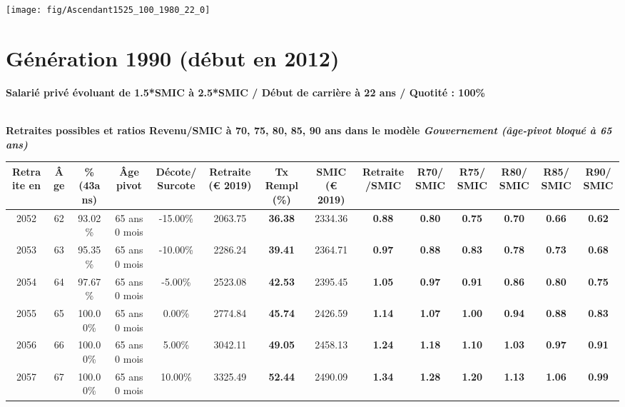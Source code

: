  {\hspace{-2.2cm}\texttt{[image: fig/Ascendant1525\_100\_1980\_22\_0]}} 

\newpage 
 
\section{Génération 1990 (début en 2012)\label{Ascendant1525_100_1990_22_0}} 
 
{\bf \noindent Salarié privé évoluant de 1.5*SMIC à 2.5*SMIC / Début de carrière à 22 ans / Quotité : 100\%}  ~ 

 ~\\{\bf \noindent Retraites possibles et ratios Revenu/SMIC à 70, 75, 80, 85, 90 ans dans le modèle \emph{Gouvernement (âge-pivot bloqué à 65 ans)}}  
 
\begin{adjustbox}{max width=\textwidth} 
\begin{tabular}[htb]{|c|c||c|c|c||c|c||c|c||c|c|c|c|c|} 
\hline 
 Retraite en &  Âge &  \%(43ans) &  Âge pivot &  Décote/Surcote &  Retraite (\euro{} 2019) &  Tx Rempl(\%) &  SMIC (\euro{} 2019) &  Retraite/SMIC &  R70/SMIC &  R75/SMIC &  R80/SMIC &  R85/SMIC &  R90/SMIC \\ 
\hline \hline 
 2052 &  62 &  93.02\% &  65 ans 0 mois &  -15.00\% &  2063.75 &  {\bf 36.38} &  2334.36 &  {\bf {\color{red} 0.88}} &  {\bf {\color{red} 0.80}} &  {\bf {\color{red} 0.75}} &  {\bf {\color{red} 0.70}} &  {\bf {\color{red} 0.66}} &  {\bf {\color{red} 0.62}} \\ 
\hline 
 2053 &  63 &  95.35\% &  65 ans 0 mois &  -10.00\% &  2286.24 &  {\bf 39.41} &  2364.71 &  {\bf {\color{red} 0.97}} &  {\bf {\color{red} 0.88}} &  {\bf {\color{red} 0.83}} &  {\bf {\color{red} 0.78}} &  {\bf {\color{red} 0.73}} &  {\bf {\color{red} 0.68}} \\ 
\hline 
 2054 &  64 &  97.67\% &  65 ans 0 mois &  -5.00\% &  2523.08 &  {\bf 42.53} &  2395.45 &  {\bf 1.05} &  {\bf {\color{red} 0.97}} &  {\bf {\color{red} 0.91}} &  {\bf {\color{red} 0.86}} &  {\bf {\color{red} 0.80}} &  {\bf {\color{red} 0.75}} \\ 
\hline 
 2055 &  65 &  100.00\% &  65 ans 0 mois &  0.00\% &  2774.84 &  {\bf 45.74} &  2426.59 &  {\bf 1.14} &  {\bf 1.07} &  {\bf 1.00} &  {\bf {\color{red} 0.94}} &  {\bf {\color{red} 0.88}} &  {\bf {\color{red} 0.83}} \\ 
\hline 
 2056 &  66 &  100.00\% &  65 ans 0 mois &  5.00\% &  3042.11 &  {\bf 49.05} &  2458.13 &  {\bf 1.24} &  {\bf 1.18} &  {\bf 1.10} &  {\bf 1.03} &  {\bf {\color{red} 0.97}} &  {\bf {\color{red} 0.91}} \\ 
\hline 
 2057 &  67 &  100.00\% &  65 ans 0 mois &  10.00\% &  3325.49 &  {\bf 52.44} &  2490.09 &  {\bf 1.34} &  {\bf 1.28} &  {\bf 1.20} &  {\bf 1.13} &  {\bf 1.06} &  {\bf {\color{red} 0.99}} \\ 
\hline 
\hline 
\end{tabular} 
\end{adjustbox} 
 

